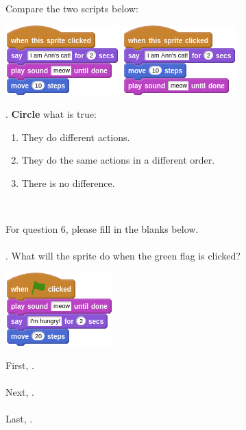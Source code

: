 \documentclass[letterpaper,12pt]{article}
\begin{document}
\noindent \dotfill

\noindent Compare the two scripts below:
\begin{center}
\includegraphics[scale=.7,valign=t]{q5_script0.png} \hspace{0.5in}
\includegraphics[scale=.7,valign=t]{q5_script1.png}
\end{center}

. \textbf{Circle} what is true:
\renewcommand{\theenumi}{\Alph{enumi}}
\begin{enumerate}
\item They do different actions. 
\item They do the same actions in a different order.
\item There is no difference.
\end{enumerate}
\noindent \dotfill \\

\newpage

\noindent For question 6, please fill in the blanks below. \\ \\
. What will the sprite do when the green flag is clicked?
\begin{center}
\includegraphics[scale=.7]{q6_script0.png}
\end{center}

\noindent First, \hrulefill . \\ \\
Next, \hrulefill . \\ \\
Last, \hrulefill . \\ \\
\end{document}
